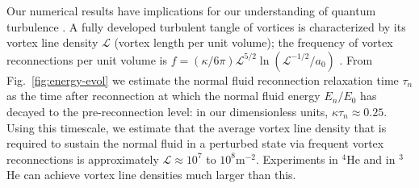 \documentclass[9pt,twocolumn,twoside]{pnas-new}
\def\red#1{\textcolor{red}{#1}}
\begin{document}
Our numerical results have implications for our understanding of 
quantum turbulence \cite{BSS2023}.
A fully developed turbulent tangle of vortices is
characterized by its vortex line density $\mathcal{L}$ (vortex length
per unit volume); the frequency 
of vortex reconnections per unit volume is 
${f=(\kappa/6\pi)\mathcal{L}^{5/2}\ln(\mathcal{L}^{-1/2}/a_0)}$
\cite{barenghi2004}. From Fig.~\ref{fig:energy-evol} we estimate the 
normal fluid reconnection relaxation time $\tau_n$ as the time 
after reconnection at which the normal fluid energy $E_n/E_0$ has decayed
to the pre-reconnection level: in our dimensionless units, $\kappa \tau_n \approx 0.25$. 
Using this timescale, we estimate that
the average vortex line density that is required to sustain the normal fluid 
in a perturbed state via frequent vortex reconnections is approximately
$\mathcal{L} \approx 10^7$ to $10^8\mathrm{m}^{-2}$. 
Experiments in $^4$He
\cite{schwarz1981,milliken1982,roche2008,roche2007,Babuin2014} and in $^3$He
\cite{bradley2006} can achieve vortex line densities much larger than this.
\end{document}
